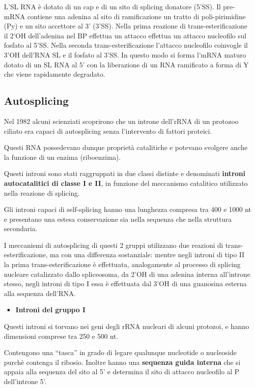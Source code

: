 \documentclass[11pt]{book}
\begin{document}
L'SL RNA è dotato di un cap e di un sito di splicing donatore (5'SS). Il
pre-mRNA contiene una adenina al sito di ramificazione un tratto di
poli-pirimidine (Py) e un sito accettore al 3' (3'SS). Nella prima
reazione di trans-esterificazione il 2'OH dell'adenina nel BP effettua
un attacco effettua un attacco nucleofilo sul fosfato al 5'SS. Nella
seconda trans-esterificazione l'attacco nucleofilo coinvogle il 3'OH
dell'RNA SL e il fosfato al 3'SS. In questo modo si forma l'mRNA maturo
dotato di un SL RNA al 5' con la liberazione di un RNA ramificato a
forma di Y che viene rapidamente degradato.

\subsection{Autosplicing}\label{autosplicing}

Nel 1982 alcuni scienziati scoprirono che un introne dell'rRNA di un
protozoo ciliato era capaci di autosplicing senza l'intervento di
fattori proteici.

Questi RNA possedevano dunque proprietà catalitiche e potevano svolgere
anche la funzione di un enzima (riboenzima).

Questi introni sono stati raggruppati in due classi distinte e
denominati \textbf{introni autocatalitici di classe I e II}, in funzione
del meccanismo catalitico utilizzato nella reazione di splicing.

Gli introni capaci di self-splicing hanno una lunghezza compresa tra 400
e 1000 nt e presentano una estesa conservazione sia nella sequenza che
nella struttura secondaria.

I meccanismi di autosplicing di questi 2 gruppi utilizzano due reazioni
di trans-esterificazione, ma con una differenza sostanziale: mentre
negli introni di tipo II la prima trans-esterificazione è effettuata,
analogamente al processo di splicing nucleare catalizzato dallo
spliceosoma, da 2'OH di una adenina interna all'introne stesso, negli
introni di tipo I essa è effettuata dal 3'OH di una guanosina esterna
alla sequenza dell'RNA.

\begin{itemize}
\itemsep1pt\parskip0pt
\item
  \textbf{Introni del gruppo I}
\end{itemize}

Questi introni si torvano nei geni degli rRNA nucleari di alcuni
protozoi, e hanno dimensioni comprese tra 250 e 500 nt.

Contengono una ``tasca'' in grado di legare qualunque nucleotide o
nucleoside purchè contenga il ribosio. Inoltre hanno una
\textbf{sequenza guida interna} che si appaia alla sequenza del sito al
5' e determina il sito di attacco nucleofilo al P dell'introne 5'.
\end{document}
